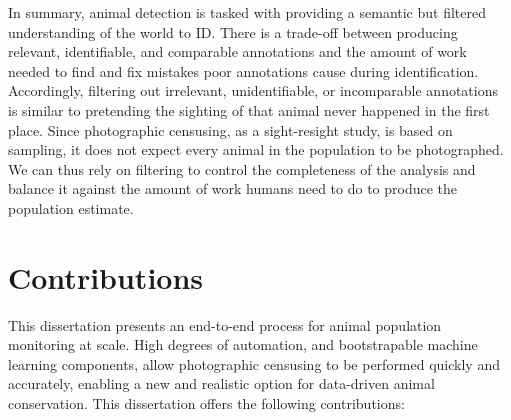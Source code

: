 In summary, animal detection is tasked with providing a semantic but filtered understanding of the world to ID.  There is a trade-off between producing relevant, identifiable, and comparable annotations and the amount of work needed to find and fix mistakes poor annotations cause during identification.  Accordingly, filtering out irrelevant, unidentifiable, or incomparable annotations is similar to pretending the sighting of that animal never happened in the first place.  Since photographic censusing, as a sight-resight study, is based on sampling, it does not expect every animal in the population to be photographed.  We can thus rely on filtering to control the completeness of the analysis and balance it against the amount of work humans need to do to produce the population estimate.

\section{Contributions}

This dissertation presents an end-to-end process for animal population monitoring at scale.  High degrees of automation, and bootstrapable machine learning components, allow photographic censusing to be performed quickly and accurately, enabling a new and realistic option for data-driven animal conservation.  This dissertation offers the following contributions:


